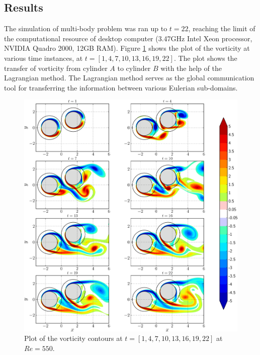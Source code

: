 \subsection{Results}

The simulation of multi-body problem was ran up to $t=22$, reaching the limit of the computational resource of desktop computer (3.47GHz Intel Xeon processor, NVIDIA Quadro 2000, 12GB RAM). Figure \ref{fig:hybrid_multipleCylinder_contours_compressed-crop} shows the plot of the vorticity at various time instances, at $t=[1,4,7,10,13,16,19,22]$. The plot shows the transfer of vorticity from cylinder $A$ to cylinder $B$ with the help of the Lagrangian method. The Lagrangian method serves as the global communication tool for transferring the information between various Eulerian sub-domains. 

	\begin{figure}[!p]
	\centering
	\includegraphics[width=\linewidth]{./figures/validation/multipleCylinder/hybrid_multipleCylinder_contours_compressed-crop.png}
	\caption{Plot of the vorticity contours at $t=[1,4,7,10,13,16,19,22]$ at $Re=550$.}
	\label{fig:hybrid_multipleCylinder_contours_compressed-crop}
	\end{figure}

